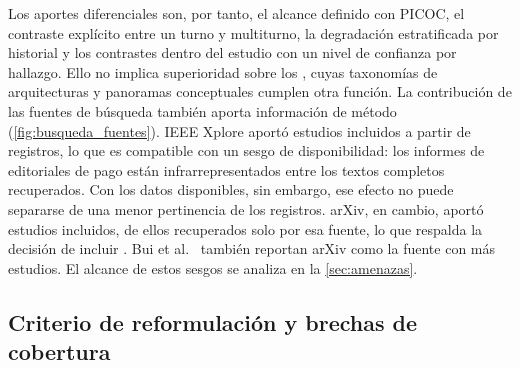 Los aportes diferenciales son, por tanto, el alcance definido con PICOC, el contraste explícito entre un turno y multiturno, la degradación estratificada por historial y los contrastes dentro del estudio con un nivel de confianza por hallazgo. Ello no implica superioridad sobre los , cuyas taxonomías de arquitecturas y panoramas conceptuales cumplen otra función. La contribución de las fuentes de búsqueda también aporta información de método (\cref{fig:busqueda_fuentes}). IEEE Xplore aportó \nInclIEEE{} estudios incluidos a partir de \nBaseIEEE{} registros, lo que es compatible con un sesgo de disponibilidad: los informes de editoriales de pago están infrarrepresentados entre los textos completos recuperados. Con los datos disponibles, sin embargo, ese efecto no puede separarse de una menor pertinencia de los registros. arXiv, en cambio, aportó \nInclArxiv{} estudios incluidos, \nSoloArxiv{} de ellos recuperados solo por esa fuente, lo que respalda la decisión de incluir . Bui et al.~\cite{Bui2026Survey} también reportan arXiv como la fuente con más estudios. El alcance de estos sesgos se analiza en la \cref{sec:amenazas}.

\subsection{Criterio de reformulación y brechas de cobertura}
\label{sec:dis-brecha}

